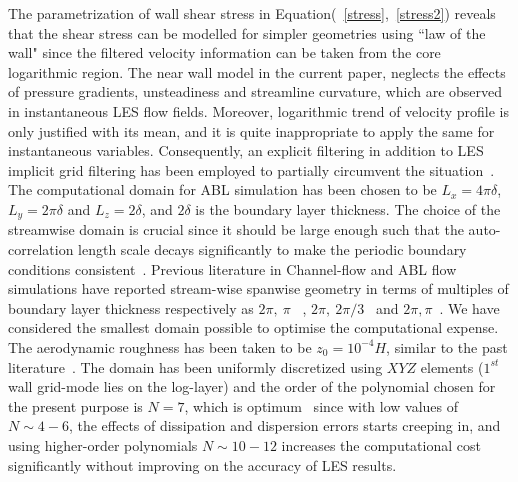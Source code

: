 \documentclass[times]{fldauth}
\begin{document}
The parametrization of wall shear stress in Equation(~\ref{stress},~\ref{stress2}) reveals that the shear stress can be modelled for simpler geometries using ``law of the wall" since the filtered velocity information can be taken from the core logarithmic region. The near wall model in the current paper, neglects the effects of pressure gradients, unsteadiness and streamline curvature, which are observed in instantaneous LES flow fields. Moreover, logarithmic trend of velocity profile is only justified with its mean, and it is quite inappropriate to apply the same for instantaneous variables. Consequently, an explicit filtering in addition to LES implicit grid filtering has been employed to partially circumvent the situation~\cite{bou1,meyers2}.\\
 The computational domain for ABL simulation has been chosen to be $L_x = 4\pi\delta$, $L_y = 2\pi\delta$ and $L_z = 2\delta$, and $2\delta$ is the boundary layer thickness. The choice of the streamwise domain is crucial since it should be large enough such that the auto-correlation length scale decays significantly to make the periodic boundary conditions consistent~\cite{kimmoinmoser,pope}. Previous literature in Channel-flow and ABL flow simulations have reported stream-wise spanwise geometry in terms of multiples of boundary layer thickness respectively as $2\pi, \ \pi$ ~\cite{kimmoinmoser,porte1a}, $2\pi, \ 2\pi/3$~\cite{porte2a} and $2\pi, \pi$~\cite{meyers2}. We have considered the smallest domain possible to optimise the computational expense. The aerodynamic roughness has been taken to be $z_0 = 10^{-4}H$, similar to the past literature~\cite{porte2a,meyers2}. The domain has been uniformly discretized using $X Y Z$ elements ($1^{st}$ wall grid-mode lies on the log-layer) and the order of the polynomial chosen for the present purpose is $N = 7$, which is optimum~\cite{nek5000} since with low values of $N\sim 4-6$, the effects of dissipation and dispersion errors starts creeping in, and using higher-order polynomials $N\sim 10-12$ increases the computational cost significantly without improving on the accuracy of LES results.  \\
\end{document}
